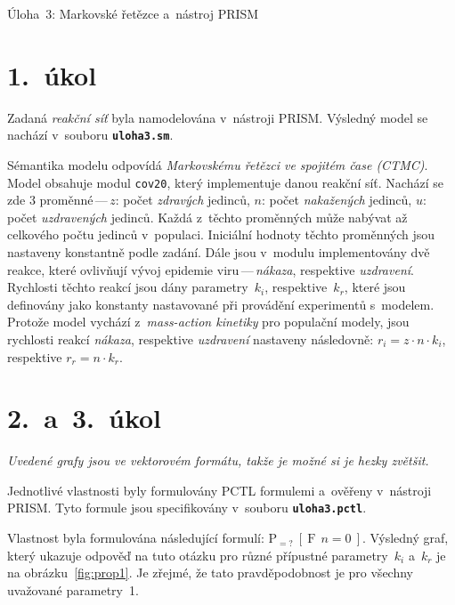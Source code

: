 \documentclass[a4paper, 11pt]{scrartcl}
\newcommand{\TASK}{3: Markovské řetězce a~nástroj PRISM}
\begin{document}
    \begin{center}
        {\Large Úloha~\TASK}
    \end{center}


    \section*{1.~úkol}

    Zadaná \emph{reakční síť} byla namodelována v~nástroji PRISM. Výsledný
    model se nachází v~souboru \texttt{\textbf{uloha3.sm}}.

    Sémantika modelu odpovídá \emph{Markovskému řetězci ve spojitém čase
    (CTMC)}. Model obsahuje modul \texttt{cov20}, který implementuje
    danou reakční síť. Nachází se zde 3 proměnné\,---\,$ z $: počet
    \emph{zdravých} jedinců, $ n $: počet \emph{nakažených} jedinců, $ u $:
    počet \emph{uzdravených} jedinců. Každá z~těchto proměnných může nabývat
    až celkového počtu jedinců v~populaci. Iniciální hodnoty těchto
    proměnných jsou nastaveny konstantně podle zadání. Dále jsou v~modulu
    implementovány dvě reakce, které ovlivňují vývoj epidemie
    viru\,---\,\emph{nákaza}, respektive \emph{uzdravení}. Rychlosti těchto
    reakcí jsou dány parametry~$ k_i $, respektive~$ k_r $, které jsou
    definovány jako konstanty nastavované při provádění experimentů s~modelem.
    Protože model vychází z~\emph{mass-action kinetiky} pro populační modely,
    jsou rychlosti reakcí \emph{nákaza}, respektive \emph{uzdravení} nastaveny
    následovně: $ r_i = z \cdot n \cdot k_i $, respektive $ r_r = n
    \cdot k_r $.


    \section*{2.~a~3.~úkol}

    {\small \emph{Uvedené grafy jsou ve vektorovém formátu, takže je možné si
    je hezky zvětšit.}}

    Jednotlivé vlastnosti byly formulovány PCTL formulemi a~ověřeny v~nástroji
    PRISM. Tyto formule jsou specifikovány v~souboru
    \texttt{\textbf{uloha3.pctl}}.

    Vlastnost 
    byla formulována následující formulí: $ \mathrm{P}_{=?}\ [\ \mathrm{F}\ \
    n = 0\ ] $. Výsledný graf, který ukazuje odpověď na tuto otázku pro různé
    přípustné parametry~$ k_i $ a~$ k_r $ je na obrázku~\ref{fig:prop1}. Je
    zřejmé, že tato pravděpodobnost je pro všechny uvažované parametry~1.
\end{document}
